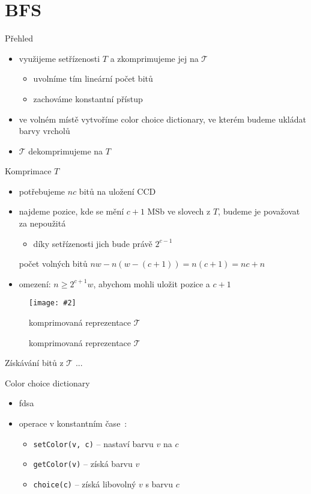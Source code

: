 \documentclass{beamer}
\makeatletter
\newcommand{\fitimage}[2][\@nil]{
	\begin{figure}
		\begin{adjustbox}{width=0.9\textwidth, totalheight=\textheight-2\baselineskip-2\baselineskip,keepaspectratio}
			\texttt{[image: \#2]}
		\end{adjustbox}
		\def\tmp{#1}%
	 \ifx\tmp\@nnil
			\else
			\caption{#1}
		\fi
	\end{figure}
}
\makeatother
\begin{document}
	\section{BFS}
	\begin{frame}{Přehled}
		\begin{itemize}
			\item využijeme setřízenosti $T$ a zkomprimujeme jej na $\mathcal{T}$
			\begin{itemize}
				\item uvolníme tím lineární počet bitů
				\item zachováme konstantní přístup
			\end{itemize}
			\item ve volném místě vytvoříme color choice dictionary, ve kterém budeme ukládat barvy vrcholů
			\item $\mathcal{T}$ dekomprimujeme na $T$
		\end{itemize}
	\end{frame}

	\begin{frame}{Komprimace $T$}
		\begin{itemize}
			\item potřebujeme $nc$ bitů na uložení CCD~\cite{DBLP:journals/corr/abs-1809-07661}
				\vfill
			\item najdeme pozice, kde se mění $c + 1$ MSb ve slovech z $T$, budeme je považovat za nepoužitá
			\begin{itemize}
				\item díky setřízenosti jich bude právě $2^{c - 1}$
			\end{itemize}
			\begin{block}{počet volných bitů}
				\centering
				$nw - n(w - (c + 1)) = n(c + 1) = nc + n$
			\end{block}
			\item omezení: $n \ge 2^{c + 1}w$, abychom mohli uložit pozice a $c + 1$
		\end{itemize}

		\fitimage[komprimovaná reprezentace $\mathcal{T}$]{images/compression.png}
	\end{frame}

	\begin{frame}{Získávání bitů z $\mathcal{T}$}
		...
	\end{frame}


	\begin{frame}{Color choice dictionary}
		\begin{itemize}
			\item fdsa
			\vfill
			\item operace v konstantním čase~\cite{DBLP:journals/corr/abs-1809-07661}:
			\begin{itemize}
				\item \texttt{setColor(v, c)} -- nastaví barvu $v$ na $c$
				\item \texttt{getColor(v)} -- získá barvu $v$
				\item \texttt{choice(c)} -- získá libovolný $v$ s barvu $c$
			\end{itemize}
		\end{itemize}
	\end{frame}
\end{document}
